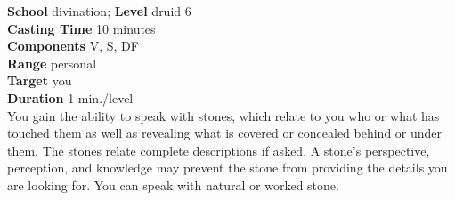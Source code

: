 \textbf{School} divination; \textbf{Level} druid 6\\
\textbf{Casting Time} 10 minutes\\
\textbf{Components} V, S, DF\\
\textbf{Range} personal\\
\textbf{Target} you\\
\textbf{Duration} 1 min./level\\
You gain the ability to speak with stones, which relate to you who or what has touched them as well as revealing what is covered or concealed behind or under them. The stones relate complete descriptions if asked. A stone's perspective, perception, and knowledge may prevent the stone from providing the details you are looking for. You can speak with natural or worked stone.\\
